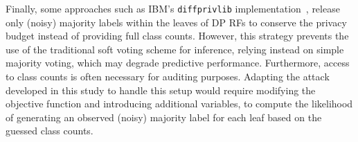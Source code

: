 Finally, some approaches such as IBM's \texttt{diffprivlib} implementation~\citep{DBLP:journals/corr/abs-1907-02444}, release only (noisy) majority labels within the leaves of DP RFs to conserve the privacy budget instead of providing full class counts. However, this strategy prevents the use of the traditional soft voting scheme for inference, relying instead on simple majority voting, which may degrade predictive performance. Furthermore, access to class counts is often necessary for auditing purposes. Adapting the attack developed in this study to handle this setup would require modifying the objective function and introducing additional variables, to compute the likelihood of generating an observed (noisy) majority label for each leaf based on the guessed class counts.